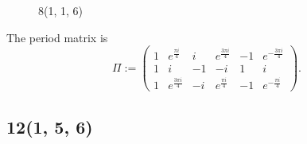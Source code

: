 \documentclass[12pt,reqno]{amsart}
\DeclareMathOperator{\Aut}{Aut}
\theoremstyle{definition}
\theoremstyle{remark}
\begin{document}
\begin{figure}[htbp]
    \centering
    \qquad
    \caption{8(1, 1, 6)}%
    \label{fig:116}%
\end{figure}

The period matrix is 
$$\Pi := \begin{pmatrix}
 1 & e^{\frac{\pi i}{4}} & i & e^{\frac{3 \pi i}{4}} & -1 & e^{-\frac{3 \pi i}{4}} \\
 1 & i & -1 & -i & 1 & i \\
 1 & e^{\frac{3 \pi i}{4}} & -i & e^{\frac{\pi i}{4}} & -1 & e^{-\frac{\pi i}{4}} \end{pmatrix}.$$ 
 


\subsection*{12(1, 5, 6)}
\end{document}

